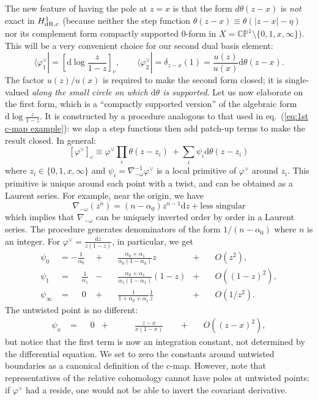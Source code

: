 \documentclass[11pt]{article}
\renewcommand{\d}{\text{d}}
\newcommand{\be}{\begin{equation}}
\newcommand{\ee}{\end{equation}}
\newcommand{\bra}[1]{\big\langle{#1}|}
\newcommand{\dual}{\vee}
\newcommand{\CP}{\mathbb{CP}}
\newcommand{\vphi}{\varphi}
\begin{document}
The new feature of having the pole at $z=x$ is that the form $d\theta(z-x)$ is 
\emph{not} exact in $H^1_{\rm dR,c}$ (because neither the step function 
$\theta(z-x)\equiv \theta(|z-x|-\eta)$ nor its complement form compactly 
supported 0-form in $X=\CP^1\setminus\{0,1,x,\infty\}$).
This will be a very convenient choice for our second dual basis element:
\be
 \bra{\vphi_1^\dual} = \left[\d\log\frac{z}{1-z}\right]_c,
 \qquad 
 \bra{\vphi_2^\dual} = \delta_{z-x}(1) = \frac{u(z)}{u(x)} \d\theta(z-x). 
 \label{2F1 dual basis}
\ee
The factor $u(z)/u(x)$ is required to make the second form closed;
it is single-valued \emph{along the small circle on which $\d\theta$ is supported}.
Let us now elaborate on the first form, which is a ``compactly supported version'' 
of the algebraic form $\d\log\frac{z}{1-z}$. It is constructed by a procedure analogous to that used 
in eq.~(\ref{eq:1st c-map example}): we slap a step functions then add patch-up terms to make the result closed.
In general:
\be \label{eq:c-map}
	\left[\vphi^\dual\right]_c \equiv \vphi^\dual\prod_{i} \theta(z-z_i)\ + \sum_{i}  \psi_i \d\theta(z-z_i) 
\ee
where $z_i\in \{0,1,x,\infty\}$ and $\psi_i= \nabla_{-\omega}^{-1} \vphi^\dual$ 
is a local primitive of $\vphi^\dual$ around $z_i$. This primitive is unique around 
each point with a twist, and can be obtained as a Laurent series. For example, near 
the origin, we have
\be
\nabla_{-\omega} (z^n) = (n-\alpha_0)z^{n-1}\d z+\mbox{less singular}
\ee
which implies that $\nabla_{-\omega}$ can be uniquely inverted order by order in 
a Laurent series. The procedure generates denominators of the form 
$1/(n -\alpha_0)$ where $n$ is an integer. For $\vphi^\dual=\frac{\d z}{z(1-z)}$, 
in particular, we get
\be\begin{aligned}
 \psi_0 &= -\frac{1}{\alpha_0} &+\quad& \frac{\alpha_0+\alpha_1}{\alpha_0(1-\alpha_0)}z &+\quad& O(z^2), \\
 \psi_1 &= \phantom{-}\frac{1}{\alpha_1} &-\quad& \frac{\alpha_0+\alpha_1}{\alpha_1(1-\alpha_1)}(1-z) &+\quad& O((1-z)^2),\\
 \psi_\infty &= \phantom{-1}0 &+\quad& \frac{1}{1+\alpha_0+\alpha_1}\frac{1}{z} &+\quad& O(1/z^2). \label{2F1 primitives}
\end{aligned}\ee
The untwisted point is no different: 
\be\begin{aligned}
 \psi_{x} &= \phantom{-1} 0 &+\quad& \phantom{-1} \frac{z-x}{x(1-x)} \phantom{-1} &+\quad& O((z-x)^2),
\end{aligned}\ee
but notice that the first term is now an integration constant, not determined by the differential equation.
We set to zero the constants around untwisted boundaries as a canonical definition of the c-map.
However, note that representatives of the relative cohomology cannot have poles at untwisted points:
if $\vphi^\vee$ had a reside, one would not be able to invert the covariant derivative.
\end{document}

